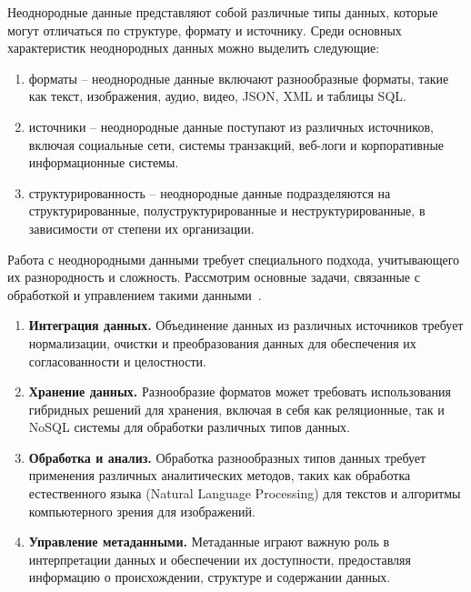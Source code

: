 Неоднородные данные представляют собой различные типы данных, которые могут отличаться по структуре, формату и источнику. 
Среди основных характеристик неоднородных данных можно выделить следующие:

\begin{enumerate}[wide=12.5mm, leftmargin=12.5mm]
	\item форматы -- неоднородные данные включают разнообразные форматы, такие как текст, изображения, аудио, видео, JSON, XML и таблицы SQL.
	\item источники -- неоднородные данные поступают из различных источников, включая социальные сети, системы транзакций, веб-логи и корпоративные информационные системы.
	\item структурированность -- неоднородные данные подразделяются на структурированные, полуструктурированные и неструктурированные, в зависимости от степени их организации.
\end{enumerate}

Работа с неоднородными данными требует специального подхода, учитывающего их разнородность и сложность.
Рассмотрим основные задачи, связанные с обработкой и управлением такими данными~\cite{big_data}.

\begin{enumerate}[wide=12.5mm, leftmargin=12.5mm]
 \item \textbf{Интеграция данных.} Объединение данных из различных источников требует нормализации, очистки и преобразования данных для обеспечения их согласованности и целостности.

 \item \textbf{Хранение данных.} Разнообразие форматов может требовать использования гибридных решений для хранения, включая в себя как реляционные, так и NoSQL системы для обработки различных типов данных.

 \item \textbf{Обработка и анализ.} Обработка разнообразных типов данных требует применения различных аналитических методов, таких как обработка естественного языка (Natural Language Processing) для текстов и алгоритмы компьютерного зрения для изображений.

 \item \textbf{Управление метаданными.} Метаданные играют важную роль в интерпретации данных и обеспечении их доступности, предоставляя информацию о происхождении, структуре и содержании данных.

\end{enumerate}

